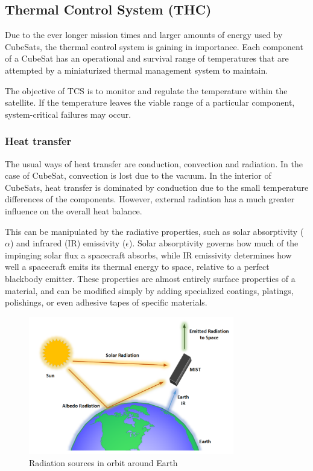 \subsection{Thermal Control System (THC)}

Due to the ever longer mission times and larger amounts of energy used by CubeSats,
the thermal control system is gaining in importance. Each component of a CubeSat
has an operational and survival range of temperatures that are attempted by a
miniaturized thermal management system to maintain. \cite{MIST_cubesat}

The objective of TCS is to monitor and regulate the temperature within the satellite.
If the temperature leaves the viable range of a particular component,
system-critical failures may occur.

\subsubsection{Heat transfer}


The usual ways of heat transfer are conduction, convection and radiation. In the
case of CubeSat, convection is lost due to the vacuum. In the interior of CubeSats,
heat transfer is dominated by conduction due to the small temperature differences
of the components. However, external radiation has a much greater influence on
the overall heat balance.

This can be manipulated by the radiative properties, such as solar absorptivity
($\alpha$) and infrared (IR) emissivity ($\epsilon$). Solar absorptivity governs
how much of the impinging solar flux a spacecraft absorbs, while IR emissivity
determines how well a spacecraft emits its thermal energy to space, relative to
a perfect blackbody emitter. These properties are almost entirely surface
properties of a material, and can be modified simply by adding specialized
coatings, platings, polishings, or even adhesive tapes of specific materials.

\begin{figure}[h]
	\centering
	\includegraphics[width=0.8\textwidth]{img/radiation_space.png}
	\caption{Radiation sources in orbit around Earth}
	\label{fig:radiation_space}
\end{figure}

